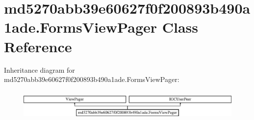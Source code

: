 \hypertarget{classmd5270abb39e60627f0f200893b490a1ade_1_1FormsViewPager}{}\section{md5270abb39e60627f0f200893b490a1ade.\+Forms\+View\+Pager Class Reference}
\label{classmd5270abb39e60627f0f200893b490a1ade_1_1FormsViewPager}
Inheritance diagram for md5270abb39e60627f0f200893b490a1ade.\+Forms\+View\+Pager\+:\begin{figure}[H]
\begin{center}
\leavevmode
\includegraphics[height=1.546961cm]{classmd5270abb39e60627f0f200893b490a1ade_1_1FormsViewPager}
\end{center}
\end{figure}
